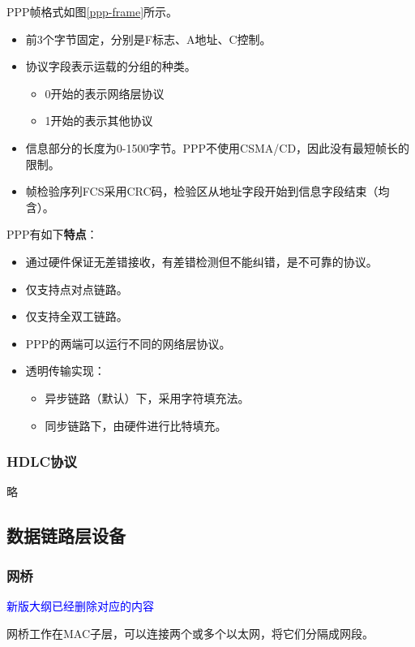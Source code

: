 \documentclass[12pt, a4paper, oneside]{ctexart}
\begin{document}
PPP帧格式如图\ref{ppp-frame}所示。
\begin{itemize}
    \item 前3个字节固定，分别是F标志、A地址、C控制。
    \item 协议字段表示运载的分组的种类。
    \begin{itemize}
        \item 0开始的表示网络层协议
        \item 1开始的表示其他协议
    \end{itemize}
    \item 信息部分的长度为0-1500字节。PPP不使用CSMA/CD，因此没有最短帧长的限制。
    \item 帧检验序列FCS采用CRC码，检验区从地址字段开始到信息字段结束（均含）。
\end{itemize}

PPP有如下\textbf{特点}：
\begin{itemize}
    \item 通过硬件保证无差错接收，有差错检测但不能纠错，是不可靠的协议。
    \item 仅支持点对点链路。
    \item 仅支持全双工链路。
    \item PPP的两端可以运行不同的网络层协议。
    \item 透明传输实现：
    \begin{itemize}
        \item 异步链路（默认）下，采用字符填充法。
        \item 同步链路下，由硬件进行比特填充。
    \end{itemize}
\end{itemize}

\subsubsection{HDLC协议}

略

\subsection{数据链路层设备}

\subsubsection{网桥}

\textcolor{blue}{新版大纲已经删除对应的内容}

网桥工作在MAC子层，可以连接两个或多个以太网，将它们分隔成网段。
\end{document}

